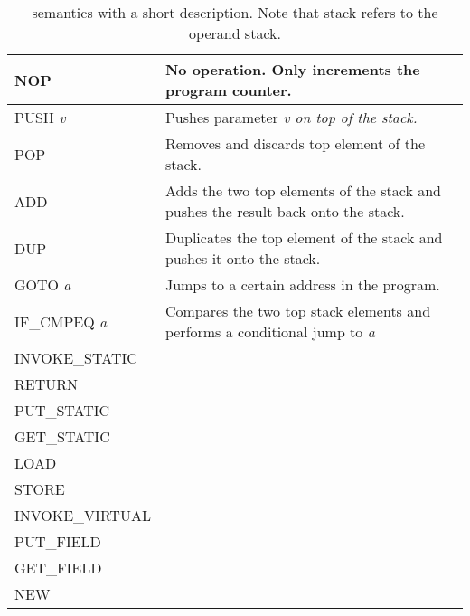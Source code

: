 \section{\jcl}
\begin{table}[]
\centering
\label{tab:instr}
\begin{tabular}{l|l}
\hline
NOP             		  & No operation. Only increments the program counter. \\ \hline
PUSH \textit{v}           & Pushes parameter \textit{v on top of the stack.} \\ \hline
POP             		  & Removes and discards top element of the stack.\\ \hline
ADD             		  & Adds the two top elements of the stack and pushes the result back onto the stack.  \\ \hline
DUP             		  & Duplicates the top element of the stack and pushes it onto the stack. \\ \hline
GOTO \textit{a}           & Jumps to a certain address in the program.  \\ \hline
IF\_CMPEQ \textit{a}   	  & Compares the two top stack elements and performs a conditional jump to \textit{a}  \\ \hline
INVOKE\_STATIC     		  &   \\ \hline
RETURN          &   \\ \hline
PUT\_STATIC     &   \\ \hline
GET\_STATIC     &   \\ \hline
LOAD            &   \\ \hline
STORE           &   \\ \hline
INVOKE\_VIRTUAL &   \\ \hline
PUT\_FIELD      &   \\ \hline
GET\_FIELD      &   \\ \hline
NEW             &   \\ \hline  
\end{tabular}
\caption{\jcl semantics with a short description. Note that stack refers to the operand stack.}
\end{table}